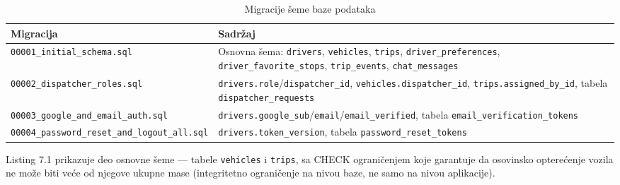 \setlength{\tabcolsep}{4pt}
\renewcommand{\arraystretch}{1.3}

\begin{longtable}{@{}|>{\small\raggedright\arraybackslash}p{}|>{\small\raggedright\arraybackslash}p{}|@{}}
\caption{Migracije šeme baze podataka}\label{tab:7-2}\\
\hline
\rowcolor{black!12}
\textbf{Migracija} & \textbf{Sadržaj} \\
\hline
\endhead
\texttt{00001\_\allowbreak initial\_\allowbreak schema.sql} & Osnovna šema: \texttt{drivers}, \texttt{vehicles}, \texttt{trips}, \texttt{driver\_\allowbreak preferences}, \texttt{driver\_\allowbreak favorite\_\allowbreak stops}, \texttt{trip\_events}, \texttt{chat\_\allowbreak messages} \\
\hline
\texttt{00002\_\allowbreak dispatcher\_\allowbreak roles.sql} & \texttt{drivers.role}/\texttt{dispatcher\_id}, \texttt{vehicles.\allowbreak dispatcher\_id}, \texttt{trips.\allowbreak assigned\_\allowbreak by\_id}, tabela \texttt{dispatcher\_\allowbreak requests} \\
\hline
\texttt{00003\_\allowbreak google\_\allowbreak and\_\allowbreak email\_\allowbreak auth.sql} & \texttt{drivers.\allowbreak google\_sub}/\texttt{email}/\texttt{email\_\allowbreak verified}, tabela \texttt{email\_\allowbreak verification\_\allowbreak tokens} \\
\hline
\texttt{00004\_\allowbreak password\_\allowbreak reset\_\allowbreak and\_\allowbreak logout\_\allowbreak all.sql} & \texttt{drivers.\allowbreak token\_version}, tabela \texttt{password\_\allowbreak reset\_\allowbreak tokens} \\
\hline
\end{longtable}

\setlength{\tabcolsep}{6pt}

Listing 7.1 prikazuje deo osnovne šeme — tabele \texttt{vehicles} i \texttt{trips}, sa CHECK ograničenjem koje garantuje da osovinsko opterećenje vozila ne može biti veće od njegove ukupne mase (integritetno ograničenje na nivou baze, ne samo na nivou aplikacije).

